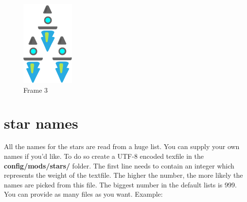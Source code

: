\begin{figure}[!h]
  \includegraphics[width=\linewidth]{chapters/modding/fleetDetails_1.png}
  \caption*{Frame 3}
\endminipage\hfill
\end{figure}

\section*{star names}
All the names for the stars are read from a huge list. You can supply your own names if you'd like. To do so create a UTF-8 encoded texfile in the \textbf{config/mods/stars/} folder. The first line needs to contain an integer which represents the weight of the textfile. The higher the number, the more likely the names are picked from this file. The biggest number in the default lists is 999. You can provide as many files as you want. Example:


